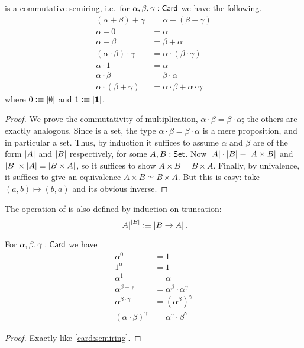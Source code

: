 \begin{lem}\label{card:semiring}
  \card is a commutative semiring, i.e.\ for $\alpha,\beta,\gamma:\mathsf{Card}$ we have the following.
  \begin{align*}
    (\alpha+\beta)+\gamma &= \alpha+(\beta+\gamma)\\
    \alpha+0 &= \alpha\\
    \alpha + \beta &= \beta + \alpha\\
    (\alpha \cdot \beta) \cdot \gamma &= \alpha \cdot (\beta\cdot\gamma)\\
    \alpha \cdot 1 &= \alpha\\
    \alpha\cdot\beta &= \beta\cdot\alpha\\
    \alpha\cdot(\beta+\gamma) &= \alpha\cdot\beta + \alpha\cdot\gamma
  \end{align*}
  where $0 \vcentcolon\equiv \left|\emptyset\right|$ and $1\vcentcolon\equiv\left|\mathbf{1}\right|$.
\end{lem}
\begin{proof}
  We prove the commutativity of multiplication, $\alpha\cdot\beta = \beta\cdot\alpha$; the others are exactly analogous.
  Since \card is a set, the type $\alpha\cdot\beta = \beta\cdot\alpha$ is a mere proposition, and in particular a set.
  Thus, by induction it suffices to assume $\alpha$ and $\beta$ are of the form $\left|A\right|$ and $\left|B\right|$ respectively, for some $A,B:\mathsf{Set}$.
  Now $\left|A\right|\cdot \left|B\right| \equiv \left|A\times B\right|$ and $\left|B\right|\times\left|A\right| \equiv \left|B\times A\right|$, so it suffices to show $A\times B = B\times A$.
  Finally, by univalence, it suffices to give an equivalence $A\times B \simeq B\times A$.
  But this is easy: take $(a,b) \mapsto (b,a)$ and its obvious inverse.
\end{proof}

\begin{defn}
  The operation of  is also defined by induction on truncation:
  \[ \left|A\right|^{\left|B\right|} \vcentcolon\equiv \left|B\to A\right|. \]
\end{defn}

\begin{lem}\label{card:exp}
  For $\alpha,\beta,\gamma:\mathsf{Card}$ we have
  \begin{align*}
    \alpha^0 &= 1\\
    1^\alpha &= 1\\
    \alpha^1 &= \alpha\\
    \alpha^{\beta+\gamma} &= \alpha^\beta \cdot \alpha^\gamma\\
    \alpha^{\beta\cdot \gamma} &= (\alpha^{\beta})^\gamma\\
    (\alpha\cdot\beta)^\gamma &= \alpha^\gamma \cdot \beta^\gamma
  \end{align*}
\end{lem}
\begin{proof}
  Exactly like \autoref{card:semiring}.
\end{proof}

